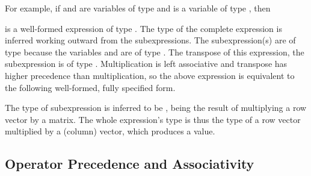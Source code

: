 For example, if  and  are variables of type
 and  is a variable of type ,
then
%
\begin{quote}
\end{quote}
%
is a well-formed expression of type .  The type of the
complete expression is inferred working outward from the
subexpressions.  The subexpression(s)  are of type
 because the variables  and  are of type
.  The transpose of this expression, the subexpression
 is of type .  Multiplication is
left associative and transpose has higher precedence than
multiplication, so the above expression is equivalent to the following
well-formed, fully specified form.
%
\begin{quote}
\end{quote}
%
The type of subexpression  is inferred to be
, being the result of multiplying a row vector by a
matrix.  The whole expression's type is thus the type of a row vector
multiplied by a (column) vector, which produces a  value.



\subsection{Operator Precedence and Associativity}\label{operator-precedence.section}

